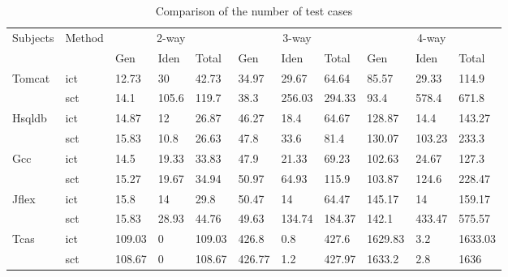 \documentclass{sig-alternate}
\begin{document}
\begin{table}[htbp]
\center
\caption{Comparison of the number of test cases}
\label{cm_elda_fglt_test}
\begin{tabular}{|ll|lll|lll|lll|}
\hline
\multirow{2}{*}{Subjects} & \multirow{2}{*}{Method} & \multicolumn{3}{c|}{2-way} & \multicolumn{3}{c|}{3-way} & \multicolumn{3}{c|}{4-way} \\ \cline{3-11}
                          &                         &Gen  & Iden & Total  &  Gen  & Iden & Total  & Gen  & Iden & Total   \\ \hline
Tomcat                    & ict                     & 12.73    & 30     & 42.73  & 34.97    & 29.67  & 64.64  & 85.57   & 29.33  & 114.9   \\
                          & sct                     & 14.1     & 105.6  & 119.7  & 38.3     & 256.03 & 294.33 & 93.4    & 578.4  & 671.8   \\ \hline
Hsqldb                    & ict                     & 14.87    & 12     & 26.87  & 46.27    & 18.4   & 64.67  & 128.87  & 14.4   & 143.27  \\
                          & sct                     & 15.83    & 10.8   & 26.63  & 47.8     & 33.6   & 81.4   & 130.07  & 103.23 & 233.3   \\ \hline
Gcc                       & ict                     & 14.5     & 19.33  & 33.83  & 47.9     & 21.33  & 69.23  & 102.63  & 24.67  & 127.3   \\
                          & sct                     & 15.27    & 19.67  & 34.94  & 50.97    & 64.93  & 115.9  & 103.87  & 124.6  & 228.47  \\ \hline
Jflex                     & ict                     & 15.8     & 14     & 29.8   & 50.47    & 14     & 64.47  & 145.17  & 14     & 159.17  \\
                          & sct                     & 15.83    & 28.93  & 44.76  & 49.63    & 134.74 & 184.37 & 142.1   & 433.47 & 575.57  \\ \hline
Tcas                      & ict                     & 109.03   & 0      & 109.03 & 426.8    & 0.8    & 427.6  & 1629.83 & 3.2    & 1633.03 \\
                          & sct                     & 108.67   & 0      & 108.67 & 426.77   & 1.2    & 427.97 & 1633.2  & 2.8    & 1636    \\ \hline
\end{tabular}
\end{table}
\end{document}
